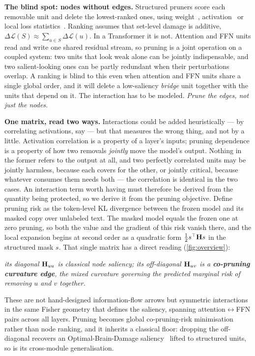 \textbf{The blind spot: nodes without edges.} Structured pruners score each removable unit and delete
the lowest-ranked ones, using weight~\citep{han2015learning},
activation~\citep{sun2024wanda,an2024flap} or local loss statistics~\citep{ma2023llmpruner,frantar2022obc}.
Ranking assumes that set-level damage is additive,
$\Delta\mathcal{L}(S)\approx\sum_{u\in S}\Delta\mathcal{L}(u)$. In a Transformer it is not. Attention
and FFN units read and write one shared residual stream, so pruning is a joint operation on a coupled
system: two units that look weak alone can be jointly indispensable, and two salient-looking ones can
be partly redundant when their perturbations overlap. A ranking is blind to this even when attention
and FFN units share a single global order, and it will delete a low-saliency \emph{bridge} unit
together with the units that depend on it. The interaction has to be modeled. \emph{Prune the edges,
not just the nodes.}

\textbf{One matrix, read two ways.} Interactions could be added heuristically --- by correlating
activations, say --- but that measures the wrong thing, and not by a little. Activation correlation is a
property of a layer's inputs; pruning dependence is a property of how two removals \emph{jointly} move
the model's output. Nothing in the former refers to the output at all, and two perfectly correlated
units may be jointly harmless, because each covers for the other, or jointly critical, because whatever
consumes them needs both --- the correlation is identical in the two cases. An interaction term worth
having must therefore be derived from the quantity being protected, so we derive it from the pruning
objective. Define
pruning risk as the token-level KL divergence between the frozen model and its masked copy over
unlabeled text. The masked model equals the frozen one at zero pruning, so both the value and the
gradient of this risk vanish there, and the local expansion begins at second order as a quadratic form
$\tfrac12 s^\top \mathbf{H} s$ in the structured mask $s$. That single matrix has a direct reading
(\cref{fig:overview}):
\begin{center}
\emph{its diagonal $\mathbf{H}_{uu}$ is classical node saliency; its off-diagonal $\mathbf{H}_{uv}$ is a
\textbf{co-pruning curvature edge}, the mixed curvature governing the predicted marginal risk of
removing $u$ and $v$ together.}
\end{center}
These are not hand-designed information-flow arrows but symmetric interactions in the same Fisher
geometry that defines the saliency, spanning attention$\leftrightarrow$FFN pairs across all layers.
Pruning becomes global co-pruning-risk minimisation rather than node ranking, and it inherits a
classical floor: dropping the off-diagonal recovers an Optimal-Brain-Damage
saliency~\citep{lecun1989obd,hassibi1993obs} lifted to structured units, so \method is its
cross-module generalisation.

